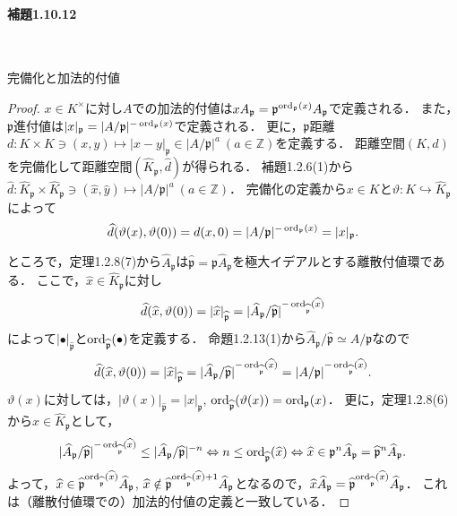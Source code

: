 \paragraph{補題1.10.12}~
\begin{screen}
  完備化と加法的付値
\end{screen}
\begin{proof}
  $x\in K^\times$に対し$A$での加法的付値は$xA_\mathfrak{p}=\mathfrak{p}^{\operatorname{ord}_\mathfrak{p}(x)}A_\mathfrak{p}$で定義される．
  また，$\mathfrak{p}$進付値は$\lvert x\rvert _\mathfrak{p}=\lvert A/\mathfrak{p}\rvert^{-\operatorname{ord}_\mathfrak{p}(x)}$で定義される．
  更に，$\mathfrak{p}$距離$d\colon K\times K\ni(x,y)\mapsto\lvert x-y\rvert _\mathfrak{p}\in\lvert A/\mathfrak{p}\rvert^a\ (a\in\mathbb{Z})$を定義する．
  距離空間$(K,d)$を完備化して距離空間$(\widehat{K}_\mathfrak{p},\widehat{d})$が得られる．
  補題1.2.6(1)から$\widehat{d}\colon\widehat{K}_\mathfrak{p}\times\widehat{K}_\mathfrak{p}\ni(\widehat{x},\widehat{y})\mapsto\lvert A/\mathfrak{p}\rvert^a\ (a\in\mathbb{Z})$．
  完備化の定義から$x\in K$と$\vartheta\colon K\hookrightarrow\widehat{K}_\mathfrak{p}$によって
  \[\widehat{d}(\vartheta(x),\vartheta(0))=d(x,0)=\lvert A/\mathfrak{p}\rvert^{-\operatorname{ord}_\mathfrak{p}(x)}=\lvert x\rvert _\mathfrak{p}.\]

  ところで，定理1.2.8(7)から$\widehat{A}_\mathfrak{p}$は$\widehat{\mathfrak{p}}=\mathfrak{p}\widehat{A}_\mathfrak{p}$を極大イデアルとする離散付値環である．
  ここで，$\widehat{x}\in\widehat{K}_\mathfrak{p}$に対し
  \[\widehat{d}(\widehat{x},\vartheta(0))=\lvert\widehat{x}\rvert _{\widehat{\mathfrak{p}}}=\lvert\widehat{A}_\mathfrak{p}/\widehat{\mathfrak{p}}\rvert^{-\operatorname{ord}_{\widehat{\mathfrak{p}}}(\widehat{x})}\]
  によって$\lvert\bullet\rvert _{\widehat{\mathfrak{p}}}$と$\operatorname{ord}_{\widehat{\mathfrak{p}}}(\bullet)$を定義する．
  命題1.2.13(1)から$\widehat{A}_\mathfrak{p}/\widehat{\mathfrak{p}}\simeq A/\mathfrak{p}$なので
  \[\widehat{d}(\widehat{x},\vartheta(0))=\lvert\widehat{x}\rvert _{\widehat{\mathfrak{p}}}=\lvert\widehat{A}_\mathfrak{p}/\widehat{\mathfrak{p}}\rvert^{-\operatorname{ord}_{\widehat{\mathfrak{p}}}(\widehat{x})}=\lvert A/\mathfrak{p}\rvert^{-\operatorname{ord}_{\widehat{\mathfrak{p}}}(\widehat{x})}.\]
  $\vartheta(x)$に対しては，$\lvert\vartheta(x)\rvert _{\widehat{\mathfrak{p}}}=\lvert x\rvert _\mathfrak{p}$, $\operatorname{ord}_{\widehat{\mathfrak{p}}}(\vartheta(x))=\operatorname{ord}_\mathfrak{p}(x)$．
  更に，定理1.2.8(6)から$\widehat{x}\in\widehat{K}_\mathfrak{p}$として，
  \[\lvert\widehat{A}_\mathfrak{p}/\widehat{\mathfrak{p}}\rvert^{-\operatorname{ord}_{\widehat{\mathfrak{p}}}(\widehat{x})}\leq\lvert\widehat{A}_\mathfrak{p}/\widehat{\mathfrak{p}}\rvert^{-n}\Leftrightarrow n\leq\operatorname{ord}_{\widehat{\mathfrak{p}}}(\widehat{x})\Leftrightarrow\widehat{x}\in\mathfrak{p}^n\widehat{A}_\mathfrak{p}=\widehat{\mathfrak{p}}^n\widehat{A}_\mathfrak{p}.\]
  よって，$\widehat{x}\in\widehat{\mathfrak{p}}^{\operatorname{ord}_{\widehat{\mathfrak{p}}}(\widehat{x})}\widehat{A}_\mathfrak{p}$, $\widehat{x}\notin\widehat{\mathfrak{p}}^{\operatorname{ord}_{\widehat{\mathfrak{p}}}(\widehat{x})+1}\widehat{A}_\mathfrak{p}$となるので，$\widehat{x}\widehat{A}_\mathfrak{p}=\widehat{\mathfrak{p}}^{\operatorname{ord}_{\widehat{\mathfrak{p}}}(\widehat{x})}\widehat{A}_\mathfrak{p}$．
  これは（離散付値環での）加法的付値の定義と一致している．


\end{proof}
